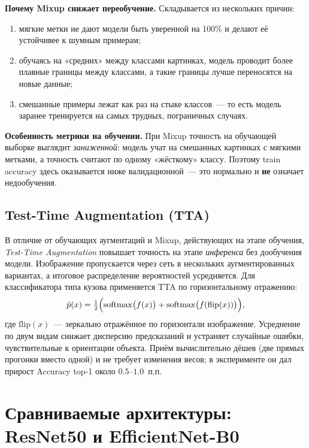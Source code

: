 \documentclass[10pt,a4paper]{report}
\numberwithin{equation}{chapter}
\numberwithin{figure}{chapter}
\numberwithin{table}{chapter}
\begin{document}
\textbf{Почему Mixup снижает переобучение.} Складывается из нескольких
причин:
\begin{enumerate}[nosep]
  \item мягкие метки не дают модели быть уверенной на 100\% и делают её
    устойчивее к шумным примерам;
  \item обучаясь на «средних» между классами картинках, модель проводит
    более плавные границы между классами, а такие границы лучше
    переносятся на новые данные;
  \item смешанные примеры лежат как раз на стыке классов~--- то есть
    модель заранее тренируется на самых трудных, пограничных случаях.
\end{enumerate}

\textbf{Особенность метрики на обучении.} При Mixup точность на обучающей
выборке выглядит \emph{заниженной}: модель учат на смешанных картинках с
мягкими метками, а точность считают по одному «жёсткому» классу. Поэтому
train accuracy здесь оказывается ниже валидационной~--- это нормально и
\textbf{не} означает недообучения.

\subsection{Test-Time Augmentation (TTA)}

В отличие от обучающих аугментаций и Mixup, действующих на этапе
обучения, \emph{Test-Time Augmentation} повышает точность на этапе
\emph{инференса} без дообучения модели. Изображение пропускается
через сеть в нескольких аугментированных вариантах, а итоговое
распределение вероятностей усредняется. Для классификатора типа
кузова применяется TTA по горизонтальному отражению:
\begin{equation}
  \hat{p}(x) = \tfrac{1}{2}\Bigl(
    \mathrm{softmax}\bigl(f(x)\bigr)
    + \mathrm{softmax}\bigl(f(\mathrm{flip}(x))\bigr)
  \Bigr),
  \label{eq:tta}
\end{equation}
где $\mathrm{flip}(x)$~--- зеркально отражённое по горизонтали
изображение. Усреднение по двум видам снижает дисперсию предсказаний
и устраняет случайные ошибки, чувствительные к ориентации объекта.
Приём вычислительно дёшев (две прямых прогонки вместо одной) и
не требует изменения весов; в эксперименте он дал прирост
Accuracy top-1 около $0.5$--$1.0$~п.п.

\section{Сравниваемые архитектуры: ResNet50 и EfficientNet-B0}
\end{document}
